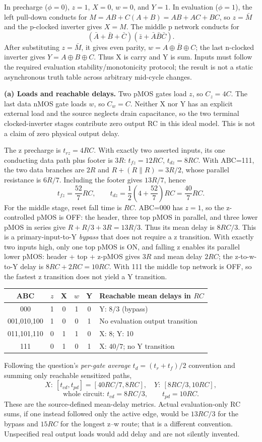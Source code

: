 \documentclass[10pt]{article}
\begin{document}
In precharge ($\phi=0$), $z=1$, $X=0$, $w=0$, and $Y=1$. In evaluation ($\phi=1$), the left pull-down conducts for $M=AB+C(A+B)=AB+AC+BC$, so $z=\bar M$ and the p-clocked inverter gives $X=M$. The middle p network conducts for
\[(\bar A+\bar B+\bar C)(\bar z+\bar A\bar B\bar C).\]
After substituting $z=\bar M$, it gives even parity, $w=\overline{A\mathbin{\oplus}B\mathbin{\oplus}C}$; the last n-clocked inverter gives $Y=A\mathbin{\oplus}B\mathbin{\oplus}C$. Thus X is carry and Y is sum. Inputs must follow the required evaluation stability/monotonicity protocol; the result is not a static asynchronous truth table across arbitrary mid-cycle changes.

\textbf{(a) Loads and reachable delays.} Two pMOS gates load $z$, so $C_z=4C$. The last data nMOS gate loads $w$, so $C_w=C$. Neither X nor Y has an explicit external load and the source neglects drain capacitance, so the two terminal clocked-inverter stages contribute zero output RC in this ideal model. This is not a claim of zero physical output delay.

The z precharge is $t_{rz}=4RC$. With exactly two asserted inputs, its one conducting data path plus footer is $3R$: $t_{fz}=12RC$, $t_{dz}=8RC$. With ABC=111, the two data branches are $2R$ and $R+(R\parallel R)=3R/2$, whose parallel resistance is $6R/7$. Including the footer gives $13R/7$, hence
\[t_{fz}=\frac{52}{7}RC,\qquad t_{dz}=\frac12\left(4+\frac{52}{7}\right)RC=\frac{40}{7}RC.\]
For the middle stage, reset fall time is $RC$. ABC=000 has $z=1$, so the z-controlled pMOS is OFF: the header, three top pMOS in parallel, and three lower pMOS in series give $R+R/3+3R=13R/3$. Thus its mean delay is $8RC/3$. This is a primary-input-to-Y \emph{bypass} that does not require a z transition. With exactly two inputs high, only one top pMOS is ON, and falling z enables its parallel lower pMOS: header + top + z-pMOS gives $3R$ and mean delay $2RC$; the z-to-w-to-Y delay is $8RC+2RC=10RC$. With 111 the middle top network is OFF, so the fastest z transition does not yield a Y transition.
\begin{center}\begin{tabular}{c|ccccl}\toprule
ABC&$z$&X&$w$&Y&Reachable mean delays in $RC$\\\midrule
000&1&0&1&0&Y: $8/3$ (bypass)\\
001,010,100&1&0&0&1&No evaluation output transition\\
011,101,110&0&1&1&0&X: 8; Y: 10\\
111&0&1&0&1&X: $40/7$; no Y transition\\\bottomrule
\end{tabular}\end{center}
Following the question's \emph{per-gate average} $t_d=(t_r+t_f)/2$ convention and summing only reachable sensitized paths,
\[\boxed{X:\ [t_{cd},t_{pd}]=[40RC/7,8RC],\quad Y:\ [8RC/3,10RC],}\]
\[\boxed{\text{whole circuit: }t_{cd}=8RC/3,\qquad t_{pd}=10RC.}\]
These are the source-defined mean-delay metrics. Actual evaluation-only RC sums, if one instead followed only the active edge, would be $13RC/3$ for the bypass and $15RC$ for the longest z--w route; that is a different convention. Unspecified real output loads would add delay and are not silently invented.
\end{document}
